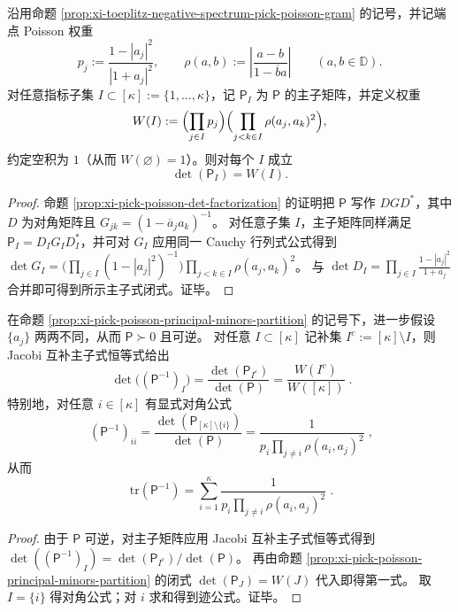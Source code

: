 \begin{proposition}\label{prop:xi-pick-poisson-principal-minors-partition}
沿用命题 \ref{prop:xi-toeplitz-negative-spectrum-pick-poisson-gram} 的记号，并记端点 Poisson 权重
\[
p_j:=\frac{1-|a_j|^2}{|1+a_j|^2},
\qquad
\rho(a,b):=\left|\frac{a-b}{1-\overline b a}\right|\qquad(a,b\in\mathbb D).
\]
对任意指标子集 \(I\subset[\kappa]:=\{1,\dots,\kappa\}\)，记 \(\mathsf P_I\) 为 \(\mathsf P\) 的主子矩阵，并定义权重
\[
W(I):=\Bigl(\prod_{j\in I}p_j\Bigr)\Bigl(\prod_{j<k\in I}\rho(a_j,a_k)^2\Bigr),
\]
约定空积为 \(1\)（从而 \(W(\varnothing)=1\)）。则对每个 \(I\) 成立
\[
\boxed{\;\det(\mathsf P_I)=W(I).\;}
\]
\end{proposition}
\begin{proof}
命题 \ref{prop:xi-pick-poisson-det-factorization} 的证明把 \(\mathsf P\) 写作 \(DGD^\ast\)，其中 \(D\) 为对角矩阵且 \(G_{jk}=(1-\overline a_j a_k)^{-1}\)。
对任意子集 \(I\)，主子矩阵同样满足 \(\mathsf P_I=D_I G_I D_I^\ast\)，并可对 \(G_I\) 应用同一 Cauchy 行列式公式得到
\(
\det G_I=\bigl(\prod_{j\in I}(1-|a_j|^2)^{-1}\bigr)\prod_{j<k\in I}\rho(a_j,a_k)^2
\)。
与 \(\det D_I=\prod_{j\in I}\frac{1-|a_j|^2}{1+\overline a_j}\) 合并即可得到所示主子式闭式。证毕。
\end{proof}

\begin{proposition}[逆矩阵主子式的互补闭式与显式对角公式]\label{prop:xi-pick-poisson-inverse-principal-minors-jacobi}
在命题 \ref{prop:xi-pick-poisson-principal-minors-partition} 的记号下，进一步假设 \(\{a_j\}\) 两两不同，从而 \(\mathsf P\succ 0\) 且可逆。
对任意 \(I\subset[\kappa]\) 记补集 \(I^c:=[\kappa]\setminus I\)，则 Jacobi 互补主子式恒等式给出
\[
\boxed{\;
\det\!\bigl((\mathsf P^{-1})_I\bigr)=\frac{\det(\mathsf P_{I^c})}{\det(\mathsf P)}
=\frac{W(I^c)}{W([\kappa])}\; }.
\]
特别地，对任意 \(i\in[\kappa]\) 有显式对角公式
\[
\boxed{\;
(\mathsf P^{-1})_{ii}
=\frac{\det(\mathsf P_{[\kappa]\setminus\{i\}})}{\det(\mathsf P)}
=\frac{1}{p_i\prod_{j\ne i}\rho(a_i,a_j)^2}\; } ,
\]
从而
\[
\boxed{\;
\mathrm{tr}(\mathsf P^{-1})
=\sum_{i=1}^{\kappa}\frac{1}{p_i\prod_{j\ne i}\rho(a_i,a_j)^2}\; } .
\]
\end{proposition}
\begin{proof}
由于 \(\mathsf P\) 可逆，对主子矩阵应用 Jacobi 互补主子式恒等式得到
\(
\det((\mathsf P^{-1})_I)=\det(\mathsf P_{I^c})/\det(\mathsf P)
\)。
再由命题 \ref{prop:xi-pick-poisson-principal-minors-partition} 的闭式 \(\det(\mathsf P_J)=W(J)\) 代入即得第一式。
取 \(I=\{i\}\) 得对角公式；对 \(i\) 求和得到迹公式。证毕。
\end{proof}


